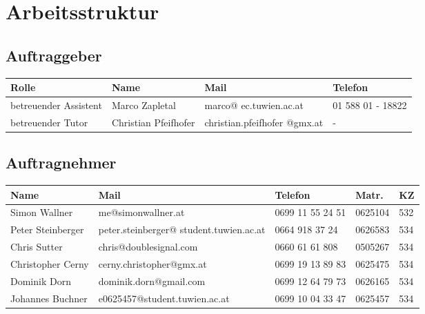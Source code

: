
\section{Arbeitsstruktur}
\subsection{Auftraggeber}
\begin{tabular}{ | l | l | p{3.5cm} | p{4cm} |}
\hline
\textbf{Rolle} & \textbf{Name} & \textbf{Mail} & \textbf{Telefon} \\
\hline
betreuender Assistent & Marco Zapletal & marco@ ec.tuwien.ac.at & 01 588 01 - 18822 \\
\hline
betreuender Tutor & Christian Pfeifhofer  & christian.pfeifhofer @gmx.at & - \\
\hline
\end{tabular}

\subsection{Auftragnehmer}
\begin{tabular}{ | l | p{5.5cm} | p{1.7cm} | l | l |}
\hline
\textbf{Name} & \textbf{Mail} & \textbf{Telefon} & \textbf{Matr.} & \textbf{KZ} \\
\hline
Simon Wallner & me@simonwallner.at & 0699 11 55 24 51 & 0625104 & 532 \\
\hline
Peter Steinberger & peter.steinberger@ student.tuwien.ac.at & 0664 918 37 24 & 0626583 & 534 \\
\hline
Chris Sutter & chris@doublesignal.com & 0660 61 61 808 & 0505267 & 534 \\
\hline
Christopher Cerny & cerny.christopher@gmx.at & 0699 19 13 89 83 & 0625475 & 534 \\
\hline
Dominik Dorn & dominik.dorn@gmail.com & 0699 12 64 79 73 & 0626165 & 534 \\
\hline
Johannes Buchner & e0625457@student.tuwien.ac.at & 0699 10 04 33 47 & 0625457 & 534 \\
\hline
\end{tabular}

